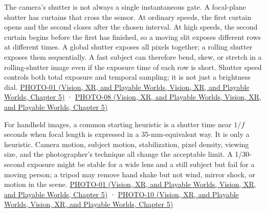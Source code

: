 The camera's shutter is not always a single instantaneous gate. A focal-plane shutter has curtains that cross the sensor. At ordinary speeds, the first curtain opens and the second closes after the chosen interval. At high speeds, the second curtain begins before the first has finished, so a moving slit exposes different rows at different times. A global shutter exposes all pixels together; a rolling shutter exposes them sequentially. A fast subject can therefore bend, skew, or stretch in a rolling-shutter image even if the exposure time of each row is short. Shutter speed controls both total exposure and temporal sampling; it is not just a brightness dial. \href{../07-Vision-XR-and-Playable-Worlds/main.pdf\#nameddest=04-visual-computing-ii-ch036-photo-01---photography-session-01}{PHOTO-01 (Vision, XR, and Playable Worlds, Vision, XR, and Playable Worlds, Chapter 5)} · \href{../07-Vision-XR-and-Playable-Worlds/main.pdf\#nameddest=04-visual-computing-ii-ch036-photo-08---photography-session-08}{PHOTO-08 (Vision, XR, and Playable Worlds, Vision, XR, and Playable Worlds, Chapter 5)}

For handheld images, a common starting heuristic is a shutter time near \(1/f\) seconds when focal length is expressed in a 35-mm-equivalent way. It is only a heuristic. Camera motion, subject motion, stabilization, pixel density, viewing size, and the photographer's technique all change the acceptable limit. A 1/30-second exposure might be stable for a wide lens and a still subject but fail for a moving person; a tripod may remove hand shake but not wind, mirror shock, or motion in the scene. \href{../07-Vision-XR-and-Playable-Worlds/main.pdf\#nameddest=04-visual-computing-ii-ch036-photo-01---photography-session-01}{PHOTO-01 (Vision, XR, and Playable Worlds, Vision, XR, and Playable Worlds, Chapter 5)} · \href{../07-Vision-XR-and-Playable-Worlds/main.pdf\#nameddest=04-visual-computing-ii-ch036-photo-10---photography-session-10}{PHOTO-10 (Vision, XR, and Playable Worlds, Vision, XR, and Playable Worlds, Chapter 5)}

